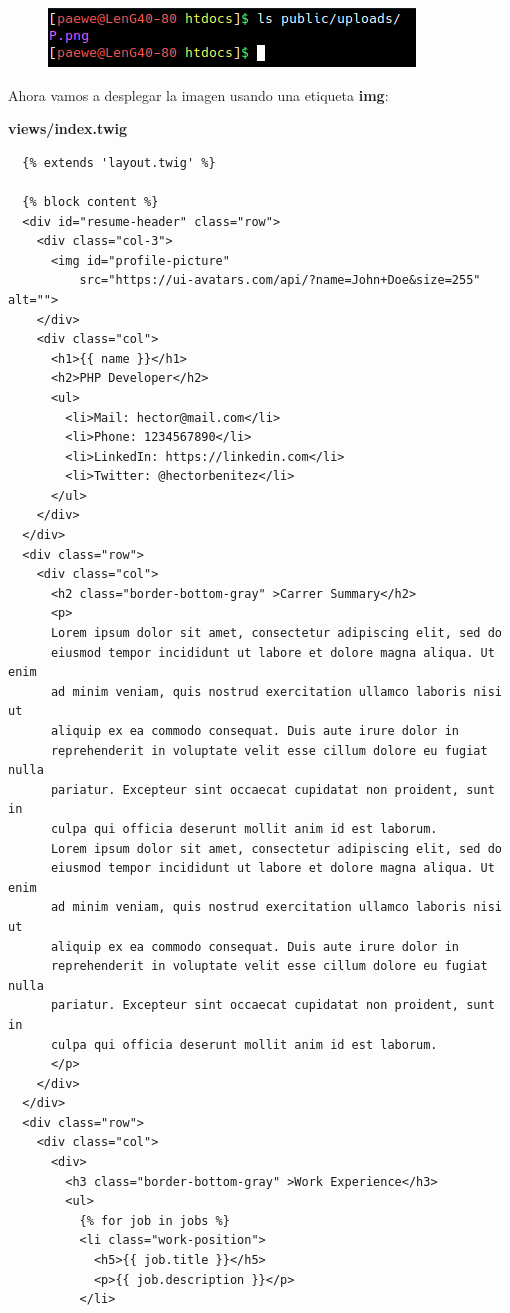 \documentclass{article}
\begin{document}
\begin{figure}[h!]
  \centering
  \includegraphics[scale=0.75]{./Pictures/187_file_saved.png}
\end{figure}


Ahora vamos a desplegar la imagen usando una etiqueta \textbf{img}:

\textbf{views/index.twig}
\begin{verbatim}
  {% extends 'layout.twig' %}

  {% block content %}
  <div id="resume-header" class="row">
    <div class="col-3">
      <img id="profile-picture"
          src="https://ui-avatars.com/api/?name=John+Doe&size=255" alt="">
    </div>
    <div class="col">
      <h1>{{ name }}</h1>
      <h2>PHP Developer</h2>
      <ul>
        <li>Mail: hector@mail.com</li>
        <li>Phone: 1234567890</li>
        <li>LinkedIn: https://linkedin.com</li>
        <li>Twitter: @hectorbenitez</li>
      </ul>
    </div>
  </div>
  <div class="row">
    <div class="col">
      <h2 class="border-bottom-gray" >Carrer Summary</h2>
      <p>
      Lorem ipsum dolor sit amet, consectetur adipiscing elit, sed do
      eiusmod tempor incididunt ut labore et dolore magna aliqua. Ut enim
      ad minim veniam, quis nostrud exercitation ullamco laboris nisi ut
      aliquip ex ea commodo consequat. Duis aute irure dolor in
      reprehenderit in voluptate velit esse cillum dolore eu fugiat nulla
      pariatur. Excepteur sint occaecat cupidatat non proident, sunt in
      culpa qui officia deserunt mollit anim id est laborum.
      Lorem ipsum dolor sit amet, consectetur adipiscing elit, sed do
      eiusmod tempor incididunt ut labore et dolore magna aliqua. Ut enim
      ad minim veniam, quis nostrud exercitation ullamco laboris nisi ut
      aliquip ex ea commodo consequat. Duis aute irure dolor in
      reprehenderit in voluptate velit esse cillum dolore eu fugiat nulla
      pariatur. Excepteur sint occaecat cupidatat non proident, sunt in
      culpa qui officia deserunt mollit anim id est laborum.
      </p>
    </div>
  </div>
  <div class="row">
    <div class="col">
      <div>
        <h3 class="border-bottom-gray" >Work Experience</h3>
        <ul>
          {% for job in jobs %}
          <li class="work-position">
            <h5>{{ job.title }}</h5>
            <p>{{ job.description }}</p>
          </li>

\end{verbatim}
\end{document}
